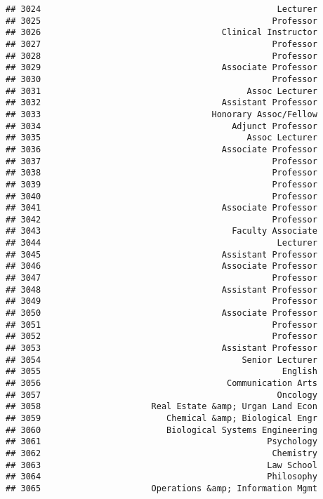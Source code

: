 \documentclass[
]{article}
\begin{document}
\begin{verbatim}
## 3024                                               Lecturer
## 3025                                              Professor
## 3026                                    Clinical Instructor
## 3027                                              Professor
## 3028                                              Professor
## 3029                                    Associate Professor
## 3030                                              Professor
## 3031                                         Assoc Lecturer
## 3032                                    Assistant Professor
## 3033                                  Honorary Assoc/Fellow
## 3034                                      Adjunct Professor
## 3035                                         Assoc Lecturer
## 3036                                    Associate Professor
## 3037                                              Professor
## 3038                                              Professor
## 3039                                              Professor
## 3040                                              Professor
## 3041                                    Associate Professor
## 3042                                              Professor
## 3043                                      Faculty Associate
## 3044                                               Lecturer
## 3045                                    Assistant Professor
## 3046                                    Associate Professor
## 3047                                              Professor
## 3048                                    Assistant Professor
## 3049                                              Professor
## 3050                                    Associate Professor
## 3051                                              Professor
## 3052                                              Professor
## 3053                                    Assistant Professor
## 3054                                        Senior Lecturer
## 3055                                                English
## 3056                                     Communication Arts
## 3057                                               Oncology
## 3058                      Real Estate &amp; Urgan Land Econ
## 3059                         Chemical &amp; Biological Engr
## 3060                         Biological Systems Engineering
## 3061                                             Psychology
## 3062                                              Chemistry
## 3063                                             Law School
## 3064                                             Philosophy
## 3065                      Operations &amp; Information Mgmt

\end{verbatim}
\end{document}
